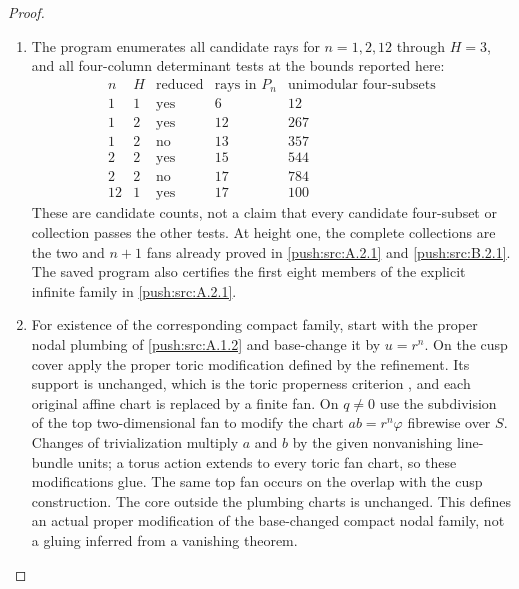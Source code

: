 \begin{proof}
\begin{enumerate}[label=\arabic*.,leftmargin=*]
\item The program  enumerates
all candidate rays for $n=1,2,12$ through $H=3$, and all
four-column determinant tests at the bounds reported here:
\[
\begin{array}{c|c|c|r|r}
n&H&\text{reduced}&\text{rays in }P_n&
       \text{unimodular four-subsets}\\\hline
1&1&\text{yes}&6&12\\
1&2&\text{yes}&12&267\\
1&2&\text{no}&13&357\\
2&2&\text{yes}&15&544\\
2&2&\text{no}&17&784\\
12&1&\text{yes}&17&100
\end{array}
\]
These are candidate counts, not a claim that every candidate
four-subset or collection passes the other tests. At height
one, the complete collections are the two and $n+1$ fans
already proved in \ref{push:src:A.2.1} and \ref{push:src:B.2.1}. The saved program also
certifies the first eight members of the explicit infinite
family in \ref{push:src:A.2.1}.

\item For existence of the corresponding compact family, start
with the proper nodal plumbing of \ref{push:src:A.1.2} and base-change it
by $u=r^n$. On the cusp cover apply the proper toric
modification defined by the refinement. Its support is
unchanged, which is the toric properness criterion
\cite[Section 2, p.6]{DMM16}, and each
original affine chart is replaced by a finite fan. On
$q\ne0$ use the subdivision of the top two-dimensional fan
to modify the chart $ab=r^n\varphi$ fibrewise over $S$.
Changes of trivialization multiply $a$ and $b$ by the given
nonvanishing line-bundle units; a torus action extends to
every toric fan chart, so these modifications glue. The same
top fan occurs on the overlap with the cusp construction.
The core outside the plumbing charts is unchanged. This defines
an actual proper modification of the base-changed compact
nodal family, not a gluing inferred from a vanishing theorem.


\end{enumerate}
\end{proof}
